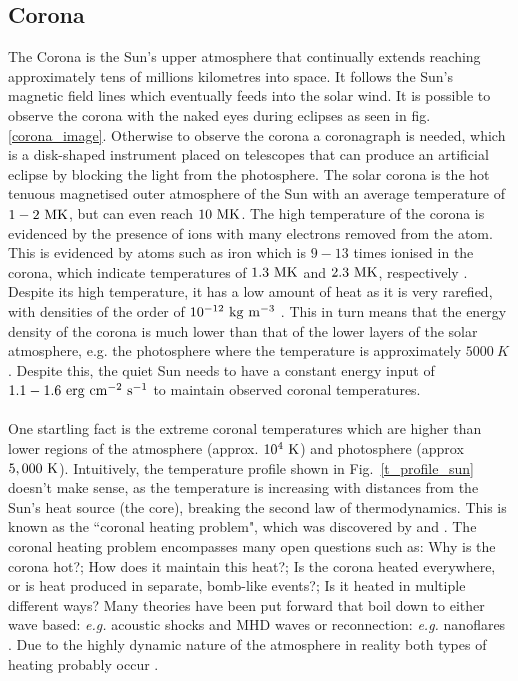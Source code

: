 \documentclass[12pt]{ociamthesis}
\newcommand{\np}{\\ \\}
\begin{document}
\subsection{Corona}
\label{ssec:corona}
The Corona is the Sun's upper atmosphere that continually extends reaching approximately tens of millions kilometres into space. It follows the Sun's magnetic field lines which eventually feeds into the solar wind. It is possible to observe the corona with the naked eyes during eclipses as seen in fig. \ref{corona_image}. Otherwise to observe the corona a coronagraph is needed, which is a disk-shaped instrument placed on telescopes that can produce an artificial eclipse by blocking the light from the photosphere. The solar corona is the hot tenuous magnetised outer atmosphere of the Sun with an average temperature of $1-2~\rm{MK}$, but can even reach $10~\rm{MK}$. The high temperature of the corona is evidenced by the presence of ions with many electrons removed from the atom. This is evidenced by atoms such as iron which is $9-13$ times ionised in the corona, which indicate temperatures of $1.3~\rm{MK}$ and $2.3~\rm{MK}$, respectively \citep{narayanan2014introduction}. Despite its high temperature, it has a low amount of heat as it is very rarefied, with densities of the order of $10^{-12}~\rm{kg~m^{-3}}$ \citep{priest2014magnetohydrodynamics}. This in turn means that the energy density of the corona is much lower than that of the lower layers of the solar atmosphere, e.g. the photosphere where the temperature is approximately $5000~{K}$. Despite this, the quiet Sun needs to have a constant energy input of $1.1-1.6~\rm{erg~cm^{-2}~s^{-1}}$ \citep{Sakurai2017PJAB9387S} to maintain observed coronal temperatures. \np
%
One startling fact is the extreme coronal temperatures which are higher than lower regions of the atmosphere (approx. $10^4~\rm{K}$) and photosphere (approx $5,000~\rm{K}$). Intuitively, the temperature profile shown in Fig.~\ref{t_profile_sun} doesn't make sense, as the temperature is increasing with distances from the Sun's heat source (the core), breaking the second law of thermodynamics. This is known as the ``coronal heating problem", which was discovered by \cite{Grotrian1939} and \cite{Edl1943}. The coronal heating problem encompasses many open questions such as: Why is the corona hot?; How does it maintain this heat?; Is the corona heated everywhere, or is heat produced in separate, bomb-like events?; Is it heated in multiple different ways? Many theories have been put forward that boil down to either wave based: \textit{e.g.} acoustic shocks and MHD waves \citep{Alfv1947MNRAS107211A, Uchida1974SoPh35451U, Wentzel1974SoPh39129W, Priest1998Natur393545P, Antolin2008IAUS247279A, Escande2019NatSR914274E} or reconnection: \textit{e.g.} nanoflares \citep{Parker1988ApJ330474P, Cargill1993SoPh147263C, Parnell2000ApJ529554P, Klimchuk2001ApJ553440K,  Cargill2004ApJ605911C, Antolin2021NatAs554A}. Due to the highly dynamic nature of the atmosphere in reality both types of heating probably occur \citep{Parnell2012RSPTA3703217P}. \np
\end{document}
